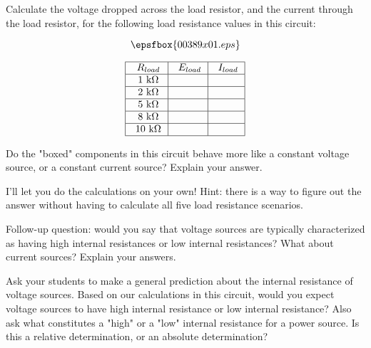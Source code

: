 

Calculate the voltage dropped across the load resistor, and the current through the load resistor, for the following load resistance values in this circuit:

$$\epsfbox{00389x01.eps}$$

$$\vbox{\offinterlineskip
\halign{\strut
\vrule \quad\hfil $#$ \ \hfil & 
\vrule \quad\hfil $#$ \ \hfil & 
\vrule \quad\hfil $#$ \ \hfil \vrule \cr
\noalign{\hrule}
%
R_{load} & E_{load} & I_{load} \cr
\noalign{\hrule}
%
\hbox{1 k} \Omega &  &  \cr
\noalign{\hrule}
%
\hbox{2 k} \Omega &  &  \cr
\noalign{\hrule}
%
\hbox{5 k} \Omega &  &  \cr
\noalign{\hrule}
%
\hbox{8 k} \Omega &  &  \cr
\noalign{\hrule}
%
\hbox{10 k} \Omega &  &  \cr
\noalign{\hrule}
%
} %
}$$ %

Do the "boxed" components in this circuit behave more like a constant voltage source, or a constant current source?  Explain your answer.







I'll let you do the calculations on your own!  Hint: there is a way to figure out the answer without having to calculate all five load resistance scenarios.

\vskip 10pt

Follow-up question: would you say that voltage sources are typically characterized as having high internal resistances or low internal resistances?  What about current sources?  Explain your answers.







Ask your students to make a general prediction about the internal resistance of voltage sources.  Based on our calculations in this circuit, would you expect voltage sources to have high internal resistance or low internal resistance?  Also ask what constitutes a "high" or a "low" internal resistance for a power source.  Is this a relative determination, or an absolute determination?




